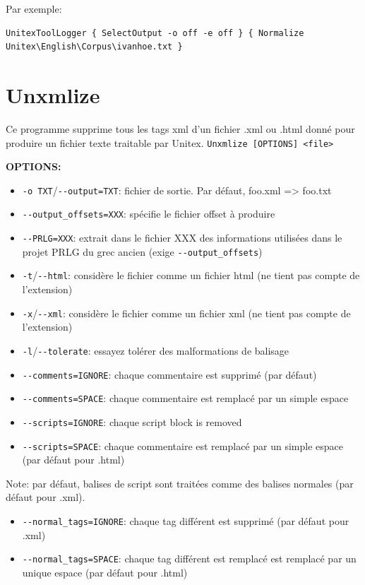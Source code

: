 \noindent Par exemple:
\begin{verbatim}
UnitexToolLogger { SelectOutput -o off -e off } { Normalize 
Unitex\English\Corpus\ivanhoe.txt }
\end{verbatim}


\section{Unxmlize}
\label{section-Unxmlize}

Ce programme supprime tous les tags xml d'un fichier .xml ou .html donné pour produire un fichier
texte traitable par Unitex.
\bigskip
\noindent
\verb+Unxmlize [OPTIONS] <file>+           

\bigskip
\noindent \textbf{OPTIONS:}
\begin{itemize}
\item \verb+-o TXT+/\verb+--output=TXT+: fichier de sortie. Par défaut, foo.xml => foo.txt
\item \verb+--output_offsets=XXX+: spécifie le fichier offset à produire
\item \verb+--PRLG=XXX+: extrait dans le fichier XXX des informations utilisées dans le projet
	PRLG du grec ancien (exige \verb+--output_offsets+)
		
\bigskip 
\item \verb+-t+/\verb+--html+: considère le fichier comme un  fichier html (ne tient pas compte de
		l'extension)
\item \verb+-x+/\verb+--xml+: considère le fichier comme un fichier xml (ne tient pas compte de
		l'extension)
\item \verb+-l+/\verb+--tolerate+: essayez tolérer des malformations de balisage
	
\bigskip	 
\item \verb+--comments=IGNORE+: chaque  commentaire est supprimé (par défaut)
\item \verb+--comments=SPACE+: chaque commentaire est remplacé par un simple  espace
		   \item \verb+--scripts=IGNORE+: chaque script block is removed
		   \item \verb+--scripts=SPACE+: chaque commentaire est remplacé par un simple  espace (par défaut pour .html)
\end{itemize}   
Note: par défaut, balises de script sont traitées comme des balises normales (par défaut pour .xml).
\begin{itemize}		     
\item \verb+--normal_tags=IGNORE+: chaque tag différent est supprimé (par défaut pour .xml)
\item \verb+--normal_tags=SPACE+: chaque tag différent est remplacé est remplacé par un unique espace (par défaut pour .html)
\end{itemize}




